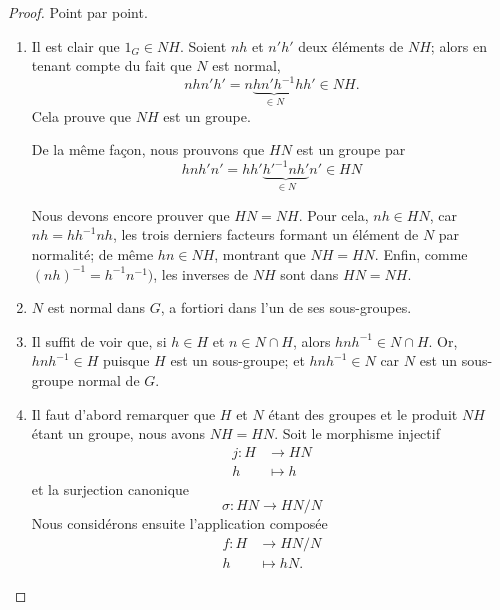 \begin{proof}
    Point par point.
    \begin{enumerate}
        \item
            Il est clair que \( 1_G \in NH \). Soient $nh$ et $n'h'$ deux éléments de \( NH \); alors en tenant compte du fait que \( N\) est normal,
            \begin{equation}
                nhn'h'=n\underbrace{hn'h^{-1}}_{\in N}hh'\in NH.
            \end{equation}
            Cela prouve que \( NH\) est un groupe.

            De la même façon, nous prouvons que \( HN\) est un groupe par
            \begin{equation}
                hnh'n'=hh'\underbrace{h'^{-1}nh'}_{\in N}n'\in HN
            \end{equation}

            Nous devons encore prouver que \( HN=NH\). Pour cela, \( nh \in HN \), car \( nh = hh^{-1}nh \), les trois derniers facteurs formant un  élément de \( N \) par normalité; de même \( hn \in NH \), montrant que \( NH = HN \). Enfin, comme \( (nh)^{-1} = h^{-1} n^{-1}) \), les inverses de \( NH \) sont dans \( HN = NH \).
        \item
            \( N\) est normal dans \( G \), a fortiori dans l'un de ses sous-groupes.
        \item
            Il suffit de voir que, si \( h \in H \) et \( n \in N \cap H \), alors \( hnh^{-1} \in N \cap H \). Or, \( hnh^{-1} \in H \) puisque \( H\) est un sous-groupe; et \( hnh^{-1} \in N \) car \( N \) est un sous-groupe normal de \( G \).
        \item
            Il faut d'abord remarquer que \( H\) et \( N\) étant des groupes et le produit \( NH\) étant un groupe, nous avons \( NH=HN\). Soit le morphisme injectif
            \begin{equation}
                \begin{aligned}
                    j\colon H&\to HN \\
                    h&\mapsto h
                \end{aligned}
            \end{equation}
            et la surjection canonique
            \begin{equation}
                \sigma\colon HN\to HN/N
            \end{equation}
            Nous considérons ensuite l'application composée
            \begin{equation}
                \begin{aligned}
                    f\colon H&\to HN/N \\
                    h&\mapsto hN.
                \end{aligned}
            \end{equation}


\end{enumerate}
\end{proof}
